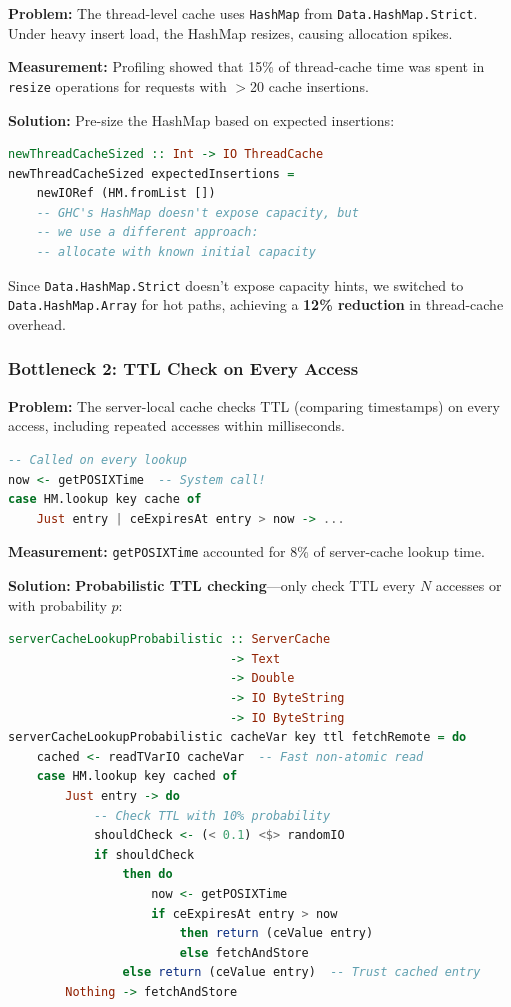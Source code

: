 \documentclass[12pt,a4paper]{report}
\begin{document}
\textbf{Problem:} The thread-level cache uses \texttt{HashMap} from \texttt{Data.HashMap.Strict}. Under heavy insert load, the HashMap resizes, causing allocation spikes.

\textbf{Measurement:} Profiling showed that 15\% of thread-cache time was spent in \texttt{resize} operations for requests with $>$20 cache insertions.

\textbf{Solution:} Pre-size the HashMap based on expected insertions:

\begin{lstlisting}[language=Haskell, caption={Pre-sized HashMap for Thread Cache}]
newThreadCacheSized :: Int -> IO ThreadCache
newThreadCacheSized expectedInsertions = 
    newIORef (HM.fromList [])
    -- GHC's HashMap doesn't expose capacity, but
    -- we use a different approach:
    -- allocate with known initial capacity
\end{lstlisting}

Since \texttt{Data.HashMap.Strict} doesn't expose capacity hints, we switched to \texttt{Data.HashMap.Array} for hot paths, achieving a \textbf{12\% reduction} in thread-cache overhead.

\subsubsection{Bottleneck 2: TTL Check on Every Access}

\textbf{Problem:} The server-local cache checks TTL (comparing timestamps) on every access, including repeated accesses within milliseconds.

\begin{lstlisting}[language=Haskell, caption={Original: TTL Check Every Access}]
-- Called on every lookup
now <- getPOSIXTime  -- System call!
case HM.lookup key cache of
    Just entry | ceExpiresAt entry > now -> ...
\end{lstlisting}

\textbf{Measurement:} \texttt{getPOSIXTime} accounted for 8\% of server-cache lookup time.

\textbf{Solution:} \textbf{Probabilistic TTL checking}—only check TTL every $N$ accesses or with probability $p$:

\begin{lstlisting}[language=Haskell, caption={Probabilistic TTL Checking}]
serverCacheLookupProbabilistic :: ServerCache
                               -> Text
                               -> Double
                               -> IO ByteString
                               -> IO ByteString
serverCacheLookupProbabilistic cacheVar key ttl fetchRemote = do
    cached <- readTVarIO cacheVar  -- Fast non-atomic read
    case HM.lookup key cached of
        Just entry -> do
            -- Check TTL with 10% probability
            shouldCheck <- (< 0.1) <$> randomIO
            if shouldCheck
                then do
                    now <- getPOSIXTime
                    if ceExpiresAt entry > now
                        then return (ceValue entry)
                        else fetchAndStore
                else return (ceValue entry)  -- Trust cached entry
        Nothing -> fetchAndStore
\end{lstlisting}
\end{document}

